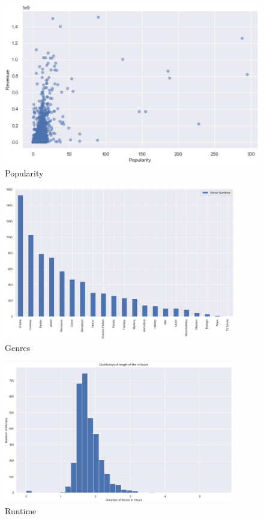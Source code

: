 \begin{figure}[htbp]
  \includegraphics[scale=0.4]{./figures/popular2.eps}
  \caption{Popularity}
\end{figure}

\begin{figure}[htbp]
  \includegraphics[width=0.9\textwidth,height=0.5\textwidth]{./figures/genres1.eps}
  \caption{Genres}
\end{figure}


\begin{figure}[htbp]
  \includegraphics[width=0.9\textwidth,height=0.5\textwidth]{./figures/runtime1.eps}
  \caption{Runtime}
\end{figure}

